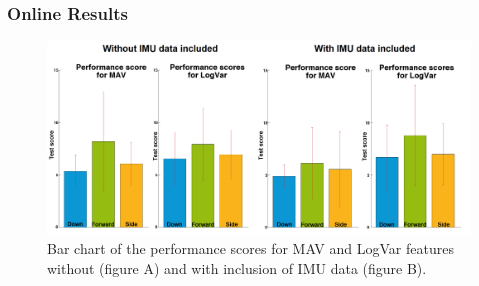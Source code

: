 	\subsubsection*{Online Results}
\begin{figure}[H]
	\centering
	\includegraphics[width=1\textwidth]{figures/paperFigures/GotItTimeCol}  %
	\caption{Bar chart of the performance scores for MAV and LogVar features without (figure A) and with inclusion of IMU data (figure B).}
	\label{fig:GotItTimeCol}
\end{figure}
	
